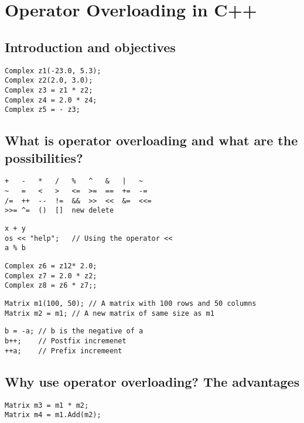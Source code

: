 \chapter{Operator Overloading in C++}

\section{Introduction and objectives}

\begin{lstlisting}
Complex z1(-23.0, 5.3);
Complex z2(2.0, 3.0);
Complex z3 = z1 * z2;
Complex z4 = 2.0 * z4;
Complex z5 = - z3;
\end{lstlisting}

\section{What is operator overloading and what are the possibilities?}

\begin{lstlisting}
+	-	*	/	%	^	&	|	~
~	=	<	>	<=	>=	==	+=	-=
/=	++	--	!=	&&	>>	<<	&=	<<=
>>=	^=	()	[]	new	delete
\end{lstlisting}

\begin{lstlisting}
x + y
os << "help";	// Using the operator <<
a % b
\end{lstlisting}

\begin{lstlisting}
Complex z6 = z12* 2.0;
Complex z7 = 2.0 * z2;
Complex z8 = z6 * z7;;
\end{lstlisting}

\begin{lstlisting}
Matrix m1(100, 50);	// A matrix with 100 rows and 50 columns
Matrix m2 = m1;	// A new matrix of same size as m1
\end{lstlisting}

\begin{lstlisting}
b = -a;	// b is the negative of a
b++;	// Postfix incremenet
++a;	// Prefix incremeent
\end{lstlisting}

\section{Why use operator overloading? The advantages}

\begin{lstlisting}
Matrix m3 = m1 * m2;
Matrix m4 = m1.Add(m2);
\end{lstlisting}

